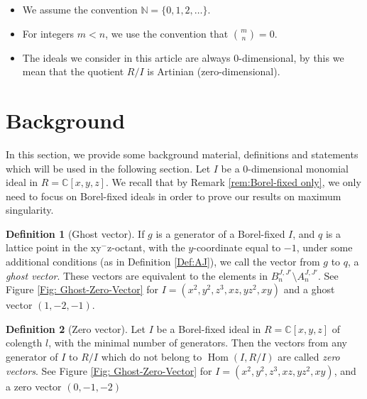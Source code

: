 \documentclass[11pt,a4paper,leqno,noamsfonts]{amsart}
\numberwithin{equation}{section}
\newcommand{\BC}{{\mathbb{C}}}
\newcommand{\BN}{{\mathbb{N}}}
\newcommand\Hom{\operatorname{Hom}}
\theoremstyle{definition}
\newtheorem{definition}{Definition}[section]
\theoremstyle{thm}
\theoremstyle{ex}
\theoremstyle{sol}
\begin{document}
\begin{itemize}
    \item We assume the convention $\BN=\{0,1,2,\ldots\}$.

    \item  For integers $m<n$, we use the convention that ${m \choose n}=0$.

    \item The ideals we consider in this article are always $0$-dimensional, by this we mean that the quotient $R/I$ is Artinian (zero-dimensional).
\end{itemize}









\section{Background}
In this section, we provide some background material, definitions and statements which will be used in the following section. Let $I$ be a $0$-dimensional monomial ideal in $R=\BC[x,y,z]$. We recall that by Remark \ref{rem:Borel-fixed only}, we only need to focus on Borel-fixed ideals in order to prove our results on maximum singularity.










\begin{definition}[Ghost vector]\label{Def:ghostVector} If $g$ is a generator of a Borel-fixed $I$, and $q$ is a lattice point in the $\mathrm{xy^{-}z}$-octant, with the $y$-coordinate equal to $-1$, under some additional conditions (as in Definition \ref{Def:AJ}), we call the vector from $g$ to $q$, a \emph{ghost vector}. These vectors are equivalent to the elements in $B^{J,J'}_n\setminus A^{J,J'}_n$. See Figure \ref{Fig: Ghost-Zero-Vector} for $I=(x^2,y^2,z^3,xz,yz^2,xy)$ and a ghost vector $(1,-2,-1)$.
    
\end{definition}

\begin{definition}[Zero vector]\label{def:ZeroVector} Let $I$ be a Borel-fixed ideal in $R=\BC[x,y,z]$ of colength $l$, with the minimal  number of generators. Then the vectors from any generator of $I$ to $R/I$ which do not belong to $\Hom(I,R/I)$ are called \emph{zero vectors}. See Figure \ref{Fig: Ghost-Zero-Vector} for $ I=(x^2,y^2,z^3,xz,yz^2,xy)$, and a zero vector $(0,-1,-2)$
    
\end{definition}
\end{document}

